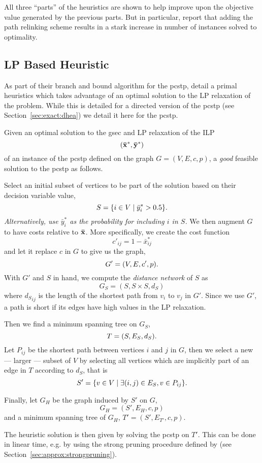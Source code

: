 All three ``parts'' of the heuristics are shown to help improve upon the
objective value generated by the previous parts.
But in particular, \citeauthor{canuto2001local} report that adding the
path relinking scheme results in a stark increase
 in number of instances solved to optimality.

 \subsection{LP Based Heuristic}
 \label{sec:heuristics:lp}
 As part of their branch and bound algorithm for the \gls{pcstp}, \cite{ljubic2005solving} detail a primal
 heuristics which takes advantage of an optimal solution to the LP relaxation of the problem. While this
 is detailed for a directed version of the \gls{pcstp} (see Section~\ref{sec:exact:dhea}) we detail it
 here for the \gls{pcstp}.
 
 Given an optimal solution to the \gls{gsec} and LP relaxation of the ILP
 $$(\mathbf{ \bar x^*}, \mathbf{\bar y^*})$$
 of an instance of the \gls{pcstp} defined on the graph $G = (V, E, c, p)$,
 a \textit{good} feasible solution to the \gls{pcstp} as follows.

 Select an initial subset of vertices to be part of the solution based on their decision variable value,
 $$S = \{ i \in V \mid \bar y^*_i > 0.5 \}\mathnormal{.}$$
 \textit{Alternatively, use $\bar y^*_i$ as the probability for including $i$ in $S$.}
 We then augment $G$ to have costs relative to $\mathbf{\bar{x}}$. More specifically,
 we create the cost function
 $$c'_{ij} = 1 - \bar{x}^*_{ij}$$
 and let it replace $c$ in $G$ to give us the graph,
 $$G' = (V, E, c', p)\mathnormal{.}$$
 With $G'$ and $S$ in hand, we compute the \textit{distance network} of $S$ as
 $$G_S = (S, S \times S, d_S)$$
 where ${d_S}_{ij}$ is the length of the shortest path from $v_i$ to $v_j$ in $G'$.
 Since we use $G'$, a path is short if its edges have high values in the LP
 relaxation.

 Then we find a minimum spanning tree on $G_S$,
 $$T = (S, E_S, d_S) \mathnormal{.}$$
 Let $P_{ij}$ be the shortest path between vertices $i$ and $j$ in $G$, then
 we select a new --- larger --- subset of $V$ by selecting all vertices which
 are implicitly part of an edge in $T$ according to $d_S$, that is
 $$S' = \{ v \in V \mid \exists (i,j) \in E_S, v \in P_{ij}\}\mathnormal{.}$$

 Finally, let $G_H$ be the graph induced by $S'$ on $G$,
 $$G_H = (S', E_H, c, p)$$
 and a minimum spanning tree of $G_H$, $T' = (S', E_{T'}, c, p)$.

 The heuristic solution is then given by solving the \gls{pcstp}
 on $T'$. This can be done in linear time, e.g. by using the
 strong pruning procedure defined by
 \citet{Johnson:2000:PCS:338219.338637}
 (see Section~\ref{sec:approx:strongpruning}).

 
 
 
